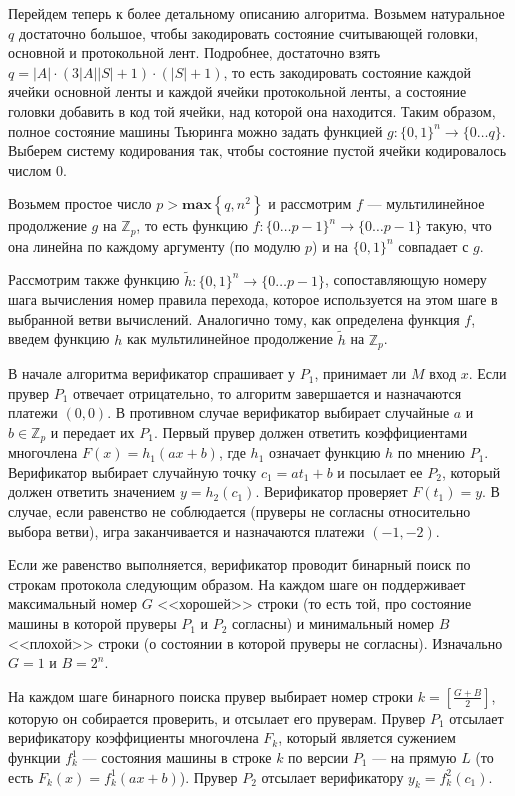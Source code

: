 \documentclass[14pt, a4paper]{extreport}
\newcommand{\set}[1]{\left\{#1\right\}}
\begin{document}
        Перейдем теперь к более детальному описанию алгоритма. Возьмем натуральное $q$ достаточно большое, чтобы закодировать состояние считывающей головки, основной и протокольной лент. Подробнее, достаточно взять $q = |A| \cdot (3|A||S| + 1) \cdot (|S| + 1)$, то есть закодировать состояние каждой ячейки основной ленты и каждой ячейки протокольной ленты, а состояние головки добавить в код той ячейки, над которой она находится. Таким образом, полное состояние машины Тьюринга можно задать функцией $g: \{0, 1\}^n \longrightarrow \{0\ldots q\}$. Выберем систему кодирования так, чтобы состояние пустой ячейки кодировалось числом 0.

        Возьмем простое число $p > \textbf{max}\set{q, n^2}$ и рассмотрим $f$ --- мультилинейное продолжение $g$ на $\mathbb{Z}_p$, то есть функцию $f: \{0\ldots p-1\}^n \longrightarrow \{0 \ldots p-1\}$ такую, что она линейна по каждому аргументу (по модулю $p$) и на $\{0, 1\}^n$ совпадает с $g$.

        Рассмотрим также функцию $\widetilde{h}: \{0, 1\}^n \longrightarrow \{0\ldots p-1\}$, сопоставляющую номеру шага вычисления номер правила перехода, которое используется на этом шаге в выбранной ветви вычислений. Аналогично тому, как определена функция $f$, введем функцию $h$ как мультилинейное продолжение $\widetilde{h}$ на $\mathbb{Z}_p$.

        В начале алгоритма верификатор спрашивает у $P_1$, принимает ли $M$ вход $x$. Если прувер $P_1$ отвечает отрицательно, то алгоритм завершается и назначаются платежи $(0, 0)$.
        В противном случае верификатор выбирает случайные $a$ и $b \in \mathbb{Z}_p$ и передает их $P_1$. Первый прувер должен ответить коэффициентами многочлена $F(x) = h_1(ax + b)$, где $h_1$ означает функцию $h$ по мнению $P_1$. Верификатор выбирает случайную точку $c_1 = a t_1 + b$ и посылает ее $P_2$, который должен ответить значением $y = h_2(c_1)$. Верификатор проверяет $F(t_1) = y$. В случае, если равенство не соблюдается (пруверы не согласны относительно выбора ветви), игра заканчивается и назначаются платежи $(-1, -2)$.

        Если же равенство выполняется, верификатор проводит бинарный поиск по строкам протокола следующим образом. На каждом шаге он поддерживает максимальный номер $G$ <<хорошей>> строки (то есть той, про состояние машины в которой пруверы $P_1$ и $P_2$ согласны) и минимальный номер $B$ <<плохой>> строки (о состоянии в которой пруверы не согласны). Изначально $G=1$ и $B=2^n$.

        На каждом шаге бинарного поиска прувер выбирает номер строки $k = \left[\frac{G + B}{2}\right]$, которую он собирается проверить, и отсылает его пруверам. Прувер $P_1$ отсылает верификатору коэффициенты многочлена $F_k$, который является сужением функции $f^1_k$ --- состояния машины в строке $k$ по версии $P_1$ --- на прямую $L$ (то есть $F_k(x) = f^1_k(ax + b)$). Прувер $P_2$ отсылает верификатору $y_k = f^2_k(c_1)$.
\end{document}
